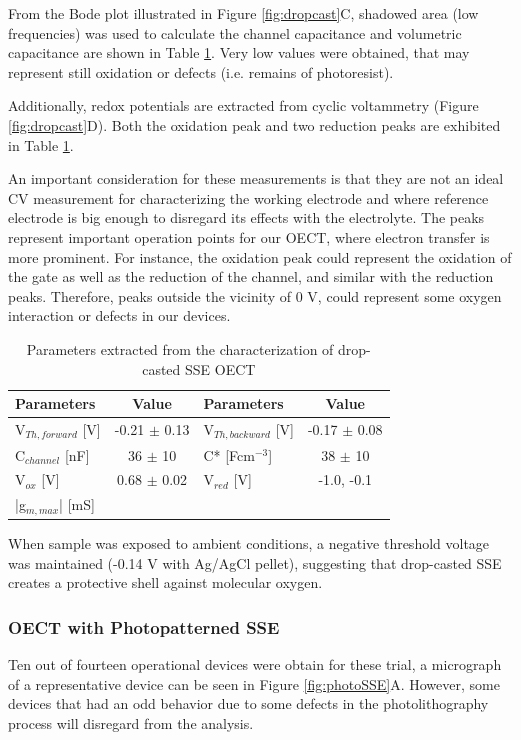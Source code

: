 From the Bode plot illustrated in Figure \ref{fig:dropcast}C, shadowed area (low frequencies) was used to calculate the channel capacitance and volumetric capacitance are shown in Table \ref{tab:dropfom}. Very low values were obtained, that may represent still oxidation or defects (i.e. remains of photoresist). %

Additionally, redox potentials are extracted from cyclic voltammetry (Figure \ref{fig:dropcast}D). Both the oxidation peak and two reduction peaks are exhibited in Table \ref{tab:dropfom}. 

An important consideration for these measurements is that they are not an ideal CV measurement for characterizing the working electrode and where reference electrode is big enough to disregard its effects with the electrolyte. The peaks represent important operation points for our OECT, where electron transfer is more prominent. For instance, the oxidation peak could represent the oxidation of the gate as well as the reduction of the channel, and similar with the reduction peaks. Therefore, peaks outside the vicinity of 0 V, could represent some oxygen interaction or defects in our devices.

\begin{table}[ht]
\centering
\caption{Parameters extracted from the characterization of drop-casted SSE OECT}
\begin{tabular}{l|c||l|c}
Parameters & Value & Parameters & Value \\\hline \hline
V$_{Th,forward}$ [V] & -0.21 $\pm$ 0.13 & V$_{Th,backward}$ [V] & -0.17 $\pm$ 0.08\\
C$_{channel}$ [nF] & 36 $\pm$ 10 & C* [Fcm$^{-3}$] & 38 $\pm$ 10 \\
V$_{ox}$ [V] & 0.68 $\pm$ 0.02 & V$_{red}$ [V] & -1.0, -0.1 \\
|g$_{m,max}$| [mS] &  &  &\\\hline
\end{tabular}
\label{tab:dropfom}
\end{table}

When sample was exposed to ambient conditions, a negative threshold voltage was maintained (-0.14 V with Ag/AgCl pellet), suggesting that drop-casted SSE creates a protective shell against molecular oxygen.%

\subsubsection{OECT with Photopatterned SSE} %
Ten out of fourteen operational devices were obtain for these trial, a micrograph of a representative device can be seen in Figure \ref{fig:photoSSE}A. However, some devices that had an odd behavior due to some defects in the photolithography process will disregard from the analysis.


